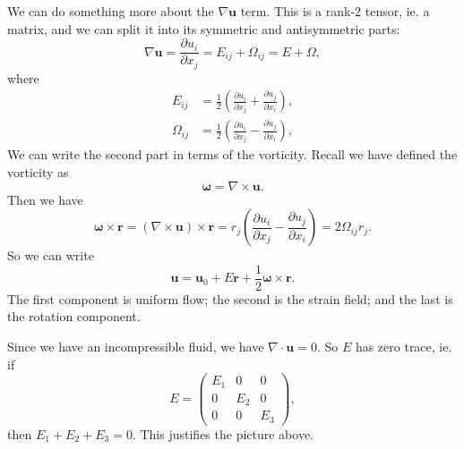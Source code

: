 \documentclass[a4paper]{article}
\begin{document}
We can do something more about the $\nabla \mathbf{u}$ term. This is a rank-2 tensor, ie. a matrix, and we can split it into its symmetric and antisymmetric parts:
\[
  \nabla \mathbf{u} = \frac{\partial u_i}{\partial x_j} = E_{ij} + \Omega_{ij} = E + \Omega,
\]
where
\begin{align*}
  E_{ij} &= \frac{1}{2}\left(\frac{\partial u_i}{\partial x_j} + \frac{\partial u_j}{\partial x_i}\right),\\
  \Omega_{ij} &=\frac{1}{2}\left(\frac{\partial u_i}{\partial x_j} - \frac{\partial u_j}{\partial x_i}\right),
\end{align*}
We can write the second part in terms of the vorticity. Recall we have defined the vorticity as
\[
  \boldsymbol\omega = \nabla \times \mathbf{u}.
\]
Then we have
\[
  \boldsymbol\omega \times \mathbf{r} = (\nabla \times \mathbf{u}) \times \mathbf{r} = r_j \left(\frac{\partial u_i}{\partial x_j} - \frac{\partial u_j}{\partial x_i}\right) = 2 \Omega_{ij}r_j.
\]
So we can write
\[
  \mathbf{u} = \mathbf{u}_0 + E \mathbf{r} + \frac{1}{2} \boldsymbol\omega \times \mathbf{r}.
\]
The first component is uniform flow; the second is the strain field; and the last is the rotation component.
\begin{center}
\end{center}
Since we have an incompressible fluid, we have $\nabla \cdot \mathbf{u} = 0$. So $E$ has zero trace, ie. if
\[
  E =
  \begin{pmatrix}
    E_1 & 0 & 0\\
    0 & E_2 & 0\\
    0 & 0 & E_3
  \end{pmatrix},
\]
then $E_1 + E_2 + E_3 = 0$. This justifies the picture above.
\end{document}
